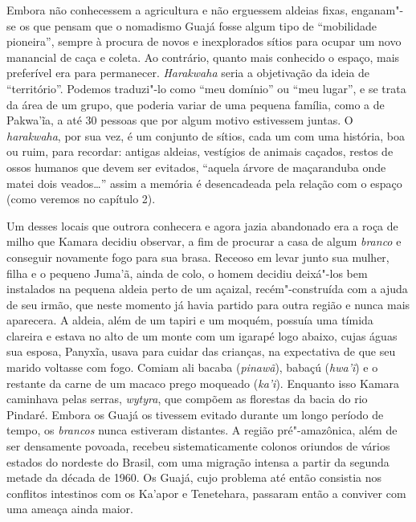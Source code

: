 Embora não conhecessem a agricultura e não erguessem aldeias fixas,
enganam"-se os que pensam que o nomadismo Guajá fosse algum tipo de
``mobilidade pioneira'', sempre à procura de novos e inexplorados sítios
para ocupar um novo manancial de caça e coleta. Ao contrário, quanto
mais conhecido o espaço, mais preferível era para permanecer.
\emph{Harakwaha} seria a objetivação da ideia de ``território''. Podemos
traduzi"-lo como ``meu domínio'' ou ``meu lugar'', e se trata da área de
um grupo, que poderia variar de uma pequena família, como a de Pakwa'ĩa,
a até 30 pessoas que por algum motivo estivessem juntas. O
\emph{harakwaha}, por sua vez, é um conjunto de sítios, cada um com uma
história, boa ou ruim, para recordar: antigas aldeias, vestígios de
animais caçados, restos de ossos humanos que devem ser evitados,
``aquela árvore de maçaranduba onde matei dois veados\ldots{}'' assim a
memória é desencadeada pela relação com o espaço (como veremos no
capítulo 2).

Um desses locais que outrora conhecera e agora jazia abandonado era a roça
de milho que Kamara decidiu observar, a fim de procurar a casa de algum
\emph{branco} e conseguir novamente fogo para sua brasa. Receoso em
levar junto sua mulher, filha e o pequeno Juma'ã, ainda de colo, o homem
decidiu deixá"-los bem instalados na pequena aldeia perto de um açaizal,
recém"-construída com a ajuda de seu irmão, que neste momento já havia
partido para outra região e nunca mais aparecera. A aldeia, além de um
tapiri e um moquém, possuía uma tímida clareira e estava no alto de um
monte com um igarapé logo abaixo, cujas águas sua esposa, Panyxĩa, usava
para cuidar das crianças, na expectativa de que seu marido voltasse com
fogo. Comiam ali bacaba (\emph{pinawã}), babaçú (\emph{hwa'ĩ}) e o
restante da carne de um macaco prego moqueado (\emph{ka'i}). Enquanto
isso Kamara caminhava pelas serras, \emph{wytyra}, que compõem as
florestas da bacia do rio Pindaré. Embora os Guajá os tivessem evitado
durante um longo período de tempo, os \emph{brancos} nunca estiveram
distantes. A região pré"-amazônica, além de ser densamente povoada,
recebeu sistematicamente colonos oriundos de vários estados do nordeste
do Brasil, com uma migração intensa a partir da segunda metade da década
de 1960. Os Guajá, cujo problema até então consistia nos conflitos
intestinos com os Ka'apor e Tenetehara, passaram então a conviver com
uma ameaça ainda maior.

